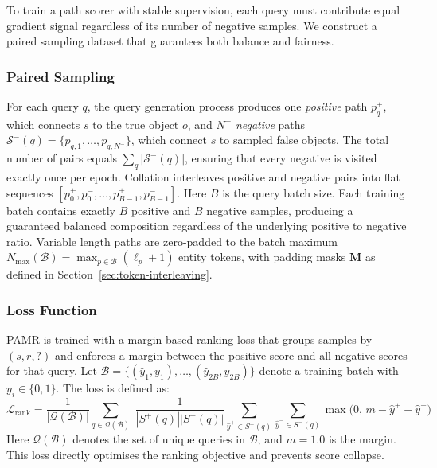 \documentclass[runningheads]{llncs}
\begin{document}
\label{sec:training}

To train a path scorer with stable supervision, each query must contribute equal gradient
signal regardless of its number of negative samples.
We construct a paired sampling
dataset that guarantees both balance and fairness.
\subsubsection{Paired Sampling}
\label{sec:paired-sampling}

For each query $q$, the query generation process produces one
\textit{positive} path $p^+_q$, which connects $s$ to the
true object $o$, and $N^-$ \textit{negative} paths
$\mathcal{S}^-(q) = \{p^-_{q,1}, \ldots, p^-_{q,N^-}\}$, which connect
$s$ to sampled false objects. The total number of pairs equals
$\sum_q |\mathcal{S}^-(q)|$, ensuring that every negative is visited exactly
once per epoch. Collation interleaves positive and negative pairs
into flat sequences
$[p^+_0, p^-_0, \ldots, p^+_{B-1}, p^-_{B-1}]$.
Here $B$ is the query batch size. Each training batch contains
exactly $B$ positive and $B$ negative samples, producing a guaranteed
balanced composition regardless of the underlying positive to negative
ratio. Variable length paths are zero-padded to the batch maximum
$N_{\max}(\mathcal{B}) = \max_{p \in \mathcal{B}} (\ell_p + 1)$
entity tokens, with padding masks $\mathbf{M}$ as defined in
Section~\ref{sec:token-interleaving}.

\subsubsection{Loss Function}
\label{sec:loss-functions}

PAMR is trained with a margin-based ranking loss that groups samples
by $(s, r, ?)$ and enforces a margin between the positive score
and all negative scores for that query. Let $\mathcal{B} = \{(\hat{y}_1, y_1), \ldots, (\hat{y}_{2B}, y_{2B})\}$
denote a training batch with $y_i \in \{0, 1\}$. The loss is defined as:
\begin{equation}
  \mathcal{L}_{\text{rank}} = \frac{1}{|\mathcal{Q}(\mathcal{B})|} \sum_{q \in \mathcal{Q}(\mathcal{B})}\; \frac{1}{|S^+(q)||S^-(q)|} \sum_{\hat{y}^+ \in S^+(q)} \sum_{\hat{y}^- \in S^-(q)}
  \max\bigl(0,\, m - \hat{y}^+ + \hat{y}^-\bigr)
  \label{eq:loss-rank}
\end{equation}
Here $\mathcal{Q}(\mathcal{B})$ denotes the set of unique queries in $\mathcal{B}$, and
$m = 1.0$ is the margin. This loss directly optimises the ranking objective and prevents
score collapse.
\end{document}
